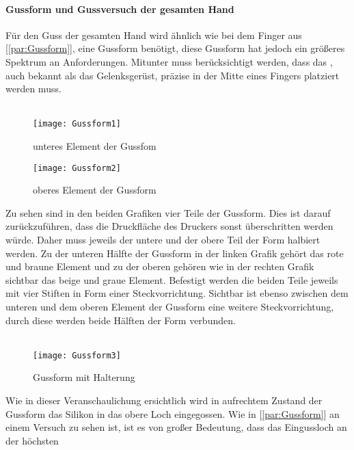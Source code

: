 \documentclass[titlepage,12pt,twoside]{article}
\begin{document}
\paragraph{Gussform und Gussversuch der gesamten Hand}
\hfill \break
\hfill \break
Für den Guss der gesamten Hand wird ähnlich wie bei dem Finger aus [\textcolor{blue}{\autoref{par:Gussform}}], eine Gussform benötigt, diese Gussform hat jedoch ein größeres Spektrum an Anforderungen. Mitunter muss berücksichtigt werden, dass das , auch 
bekannt als das Gelenksgerüst, präzise in der Mitte eines Fingers platziert werden muss. \\
\\
\begin{figure}[H]
	\begin{center}
		\scalebox{0.8}
		{\texttt{[image: Gussform1]}}
		\caption{unteres Element der Gussfom}
		\label{fig:Gussform1}			
	\end{center}
\end{figure}
\begin{figure}[H]
	\begin{center}
		\scalebox{0.8}
		{\texttt{[image: Gussform2]}}
		\caption{oberes Element der Gussform}
		\label{fig:Gussform2}			
	\end{center}
\end{figure}
\hfill \break
Zu sehen sind in den beiden Grafiken vier Teile der Gussform. Dies ist darauf zurückzuführen, dass die Druckfläche des Druckers sonst überschritten werden würde. Daher muss jeweils der untere und der obere Teil der Form halbiert werden. Zu der 
unteren Hälfte der Gussform in der linken Grafik gehört das rote und braune Element und zu der oberen gehören wie in der rechten Grafik sichtbar das beige und graue Element. Befestigt werden die beiden Teile jeweils mit vier Stiften in Form einer 
Steckvorrichtung. Sichtbar ist ebenso zwischen dem unteren und dem oberen Element der Gussform eine weitere Steckvorrichtung, durch diese werden beide Hälften der Form verbunden. \\
\\
\begin{figure}[H]
	\begin{center}
		\scalebox{0.8}
		{\texttt{[image: Gussform3]}}
		\caption{Gussform mit Halterung}
		\label{fig:Gussform3}			
	\end{center}
\end{figure}
\hfill \break
Wie in dieser Veranschaulichung ersichtlich wird in aufrechtem Zustand der Gussform das Silikon in das obere Loch eingegossen. Wie in [\textcolor{blue}{\autoref{par:Gussform}}] an einem Versuch zu sehen ist, ist es von großer Bedeutung, dass das Eingussloch an der höchsten 
\end{document}
